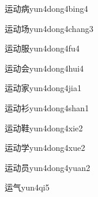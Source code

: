 \begin{verbete}[7;6;10]{运动病}{yun4dong4bing4}
\end{verbete}
\begin{verbete}[7;6;6]{运动场}{yun4dong4chang3}
\end{verbete}
\begin{verbete}[7;6;8]{运动服}{yun4dong4fu4}
\end{verbete}
\begin{verbete}[7;6;6]{运动会}{yun4dong4hui4}
\end{verbete}
\begin{verbete}[7;6;10]{运动家}{yun4dong4jia1}
\end{verbete}
\begin{verbete}[7;6;8]{运动衫}{yun4dong4shan1}
\end{verbete}
\begin{verbete}[7;6;15]{运动鞋}{yun4dong4xie2}
\end{verbete}
\begin{verbete}[7;6;8]{运动学}{yun4dong4xue2}
\end{verbete}
\begin{verbete}[7;6;7]{运动员}{yun4dong4yuan2}
\end{verbete}
\begin{verbete}[7;4]{运气}{yun4qi5}
\end{verbete}

